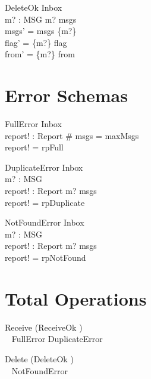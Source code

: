 \documentclass{article}
\begin{document}
\begin{schema}{DeleteOk}
  \Delta Inbox \\
  m? : MSG
\where
  m? \in msgs \\
  msgs' = msgs \setminus \{m?\} \\
  flag' = \{m?\} \ndres flag \\
  from' = \{m?\} \ndres from
\end{schema}

\section{Error Schemas}

\begin{schema}{FullError}
  \Xi Inbox \\
  report! : Report
\where
  \# msgs = maxMsgs \\
  report! = rpFull
\end{schema}

\begin{schema}{DuplicateError}
  \Xi Inbox \\
  m? : MSG \\
  report! : Report
\where
  m? \in msgs \\
  report! = rpDuplicate
\end{schema}

\begin{schema}{NotFoundError}
  \Xi Inbox \\
  m? : MSG \\
  report! : Report
\where
  m? \notin msgs \\
  report! = rpNotFound
\end{schema}

\section{Total Operations}

\begin{zed}
  Receive  (ReceiveOk \land [report! : Report | report! = rpOk]) \\
    \quad~ \lor FullError \lor DuplicateError
\end{zed}

\begin{zed}
  Delete  (DeleteOk \land [report! : Report | report! = rpOk]) \\
    \quad~ \lor NotFoundError
\end{zed}
\end{document}
